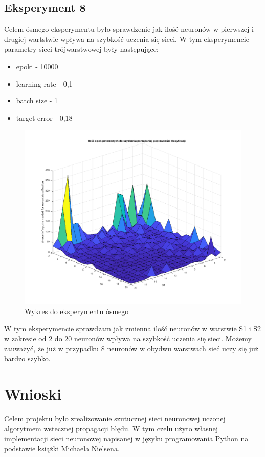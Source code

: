 \documentclass[12pt,twoside]{article}
\begin{document}
\subsection{Eksperyment 8}
Celem ósmego eksperymentu było sprawdzenie jak ilość neuronów w pierwszej i drugiej wartstwie wpływa na szybkość uczenia się sieci.
W tym eksperymencie parametry sieci trójwarstwowej były następujące:
\begin{itemize}
	\item epoki - 10000
	\item learning rate - 0,1
	\item batch size - 1
	\item target error - 0,18
\end{itemize}
\begin{figure}[ht!]
	\centering
	\includegraphics[width=15cm]{figures/S1=2+_S2=2+_epo.png}
	\caption{Wykres do eksperymentu ósmego}
\end{figure}
W tym eksperymencie sprawdzam jak zmienna ilość neuronów w warstwie S1 i S2 w zakresie od 2 do 20 neuronów wpływa na szybkość uczenia się sieci. Możemy zauważyć, że już w przypadku 8 neuronów w obydwu warstwach sieć uczy się już bardzo szybko.
\newpage


\clearpage

\section{Wnioski}

Celem projektu było zrealizowanie szutucznej sieci neuronowej uczonej algorytmem wstecznej propagacji błędu. W tym czelu użyto własnej implementacji sieci neuronowej napisanej w języku programowania Python na podstawie książki Michaela Nielsena.
\end{document}
